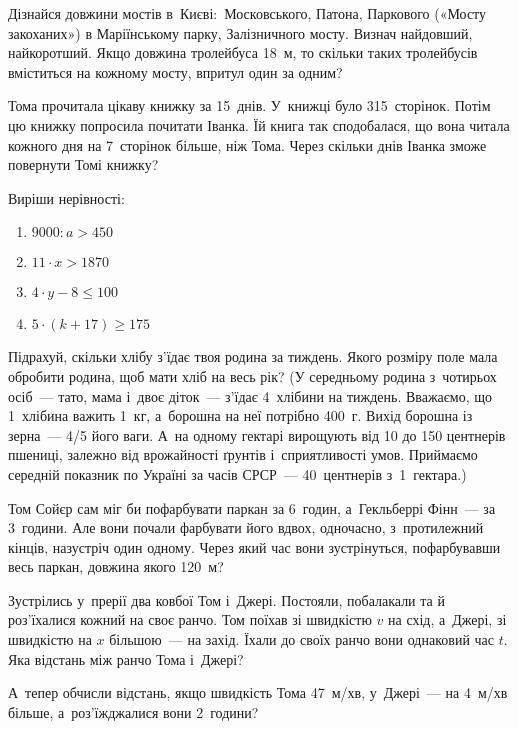 \problem
Дізнайся довжини мостів в~Києві: Московського, Патона,
Паркового («Мосту закоханих») в Маріїнському парку, Залізничного мосту.
Визнач найдовший, найкоротший.
Якщо довжина тролейбуса 18~м, то скільки таких тролейбусів
вміститься на кожному мосту, впритул один за одним?


\problem
Тома прочитала цікаву книжку за 15~днів. У~книжці було 315~сторінок.
Потім цю книжку попросила почитати Іванка. Їй книга так сподобалася,
що вона читала кожного дня на 7~сторінок більше, ніж Тома.
Через скільки днів Іванка зможе повернути Томі книжку?


\problem
Виріши нерівності:
\begin{multicols}{2}
  \begin{enumerate}
    \item $9000 : a > 450$
    \item $11 \cdot x > 1870$
    \item $4 \cdot y - 8 \leqslant 100$
    \item $5 \cdot (k + 17) \geqslant 175$
  \end{enumerate}
\end{multicols}


\problem
Підрахуй, скільки хлібу з’їдає твоя родина за тиждень.
Якого розміру поле мала обробити родина, щоб мати хліб на весь рік?
(У середньому родина з~чотирьох осіб~--- тато, мама і~двоє діток~---
з’їдає 4~хлібини на тиждень. Вважаємо, що 1~хлібина важить 1~кг,
а~борошна на неї потрібно 400~г. Вихід борошна із зерна~--- 4/5 його ваги.
А~на одному гектарі вирощують від 10 до 150 центнерів пшениці,
залежно від врожайності ґрунтів і~сприятливості умов.
Приймаємо середній показник по Україні за часів СРСР~---
40~центнерів з~1~гектара.)


\problem
Том Сойєр сам міг би пофарбувати паркан за 6~годин,
а~Гекльберрі Фінн~--- за 3~години. Але вони почали фарбувати його вдвох,
одночасно, з~протилежний кінців, назустріч один одному.
Через який час вони зустрінуться, пофарбувавши весь паркан,
довжина якого 120~м?


\problem
Зустрілись у~прерії два ковбої Том і~Джері. Постояли, побалакали та й
роз’їхалися кожний на своє ранчо. Том поїхав зі швидкістю $v$ на схід,
а~Джері, зі швидкістю на $x$ більшою~--- на захід. Їхали до своїх ранчо
вони однаковий час $t$. Яка відстань між ранчо Тома і~Джері?

А~тепер обчисли відстань, якщо швидкість Тома 47~м/хв,
у~Джері~--- на 4~м/хв більше, а~роз’їжджалися вони 2~години?


